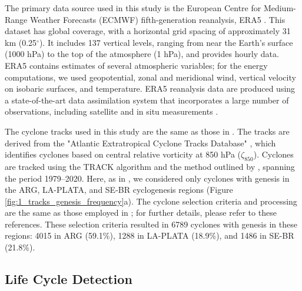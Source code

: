 \documentclass[pdflatex,sn-chicago]{sn-jnl}%
\theoremstyle{plain}
\theoremstyle{definition}
\theoremstyle{remark}
\theoremstyle{definition}
\begin{document}
The primary data source used in this study is the European Centre for Medium-Range Weather Forecasts (ECMWF) fifth-generation reanalysis, ERA5 \citep{hersbach2020era5}. This dataset has global coverage, with a horizontal grid spacing of approximately 31 km (0.25$^\circ$). It includes 137 vertical levels, ranging from near the Earth's surface (1000 hPa) to the top of the atmosphere (1 hPa), and provides hourly data. ERA5 contains estimates of several atmospheric variables; for the energy computations, we used geopotential, zonal and meridional wind, vertical velocity on isobaric surfaces, and temperature. ERA5 reanalysis data are produced using a state-of-the-art data assimilation system that incorporates a large number of observations, including satellite and in situ measurements \citep{hersbach2020era5}.

The cyclone tracks used in this study are the same as those in \citet{gramcianinov2020analysis, couto2024new, de2025lorenz}. The tracks are derived from the "Atlantic Extratropical Cyclone Tracks Database" \citep{gramcianinov2020data}, which identifies cyclones based on central relative vorticity at 850 hPa ($\zeta_{850}$). Cyclones are tracked using the TRACK algorithm \citep{hodges1994general, hodges1995feature} and the method outlined by \citet{hoskins2002new}, spanning the period 1979--2020. Here, as in \citet{de2025lorenz}, we considered only cyclones with genesis in the ARG, LA-PLATA, and SE-BR cyclogenesis regions (Figure \ref{fig:1_tracks_genesis_frequency}a). The cyclone selection criteria and processing are the same as those employed in \citet{couto2024new, de2025lorenz}; for further details, please refer to these references. These selection criteria resulted in 6789 cyclones with genesis in these regions: 4015 in ARG (59.1\%), 1288 in LA-PLATA (18.9\%), and 1486 in SE-BR (21.8\%).

\subsection{Life Cycle Detection}
\label{sec:life_cycle}
\end{document}
